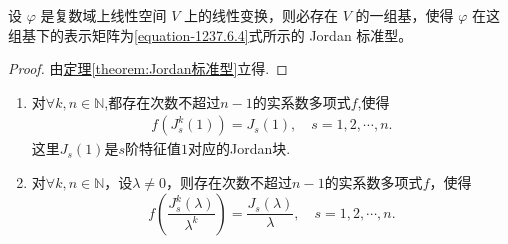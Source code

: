 \documentclass[../../main.tex]{subfiles}
\begin{document}
\begin{theorem}\label{theorem:线性变换一定有一个Jordan矩阵作为其表示矩阵}
设 $\varphi$ 是复数域上线性空间 $V$ 上的线性变换，则必存在 $V$ 的一组基，使得 $\varphi$ 在这组基下的表示矩阵为\eqref{equation-1237.6.4}式所示的 Jordan 标准型。
\end{theorem}
\begin{proof}
由\hyperref[theorem:Jordan标准型]{定理\ref{theorem:Jordan标准型}}立得.

\end{proof}

\begin{proposition}\label{proposition:特征值为1的Jordan块可由其k次幂的多项式表示}
\begin{enumerate}[(1)]
\item 对$\forall k,n\in \mathbb{N}$,都存在次数不超过$n-1$的实系数多项式$f$,使得
\begin{align}\label{eq::28947234n9jf0wej0}
f\left( J_{s}^{k}(1) \right) =J_s(1),\quad s=1,2,\cdots ,n.
\end{align}
这里$J_s(1)$是$s$阶特征值$1$对应的Jordan块.

\item 对$\forall k,n\in \mathbb{N}$，设$\lambda \ne 0$，则存在次数不超过$n-1$的实系数多项式$f$，使得
\[
f\left( \frac{J_{s}^{k}\left( \lambda \right)}{\lambda ^k} \right) =\frac{J_s\left( \lambda \right)}{\lambda},\quad s=1,2,\cdots ,n.
\]
\end{enumerate}
\end{proposition}
\end{document}
